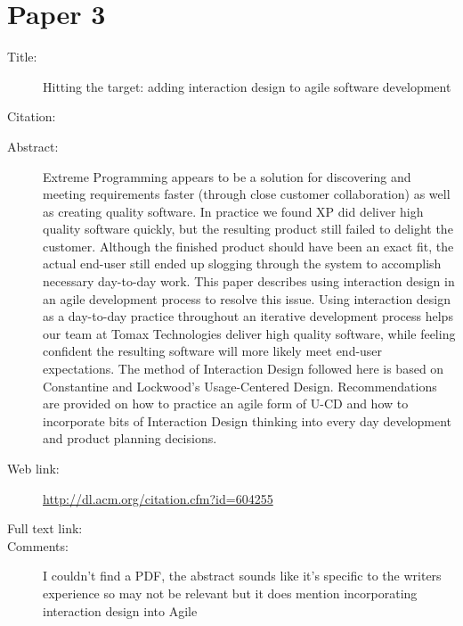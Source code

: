 \documentclass{scrartcl}
\begin{document}
\section*{Paper 3}
\begin{description}
\item[Title:] Hitting the target: adding interaction design to agile software development
\item[Citation:] \cite{Patton}
\item[Abstract:] Extreme Programming appears to be a solution for discovering and meeting requirements faster (through close customer collaboration) as well as creating quality software. In practice we found XP did deliver high quality software quickly, but the resulting product still failed to delight the customer. Although the finished product should have been an exact fit, the actual end-user still ended up slogging through the system to accomplish necessary day-to-day work. This paper describes using interaction design in an agile development process to resolve this issue. Using interaction design as a day-to-day practice throughout an iterative development process helps our team at Tomax Technologies deliver high quality software, while feeling confident the resulting software will more likely meet end-user expectations. The method of Interaction Design followed here is based on Constantine and Lockwood's Usage-Centered Design. Recommendations are provided on how to practice an agile form of U-CD and how to incorporate bits of Interaction Design thinking into every day development and product planning decisions.
\item[Web link:] \url{http://dl.acm.org/citation.cfm?id=604255}
\item[Full text link:]
\item[Comments:]  I couldn't find a PDF, the abstract sounds like it's specific to the writers experience so may not be relevant but it does mention incorporating interaction design into Agile 
\end{description}
\end{document}
